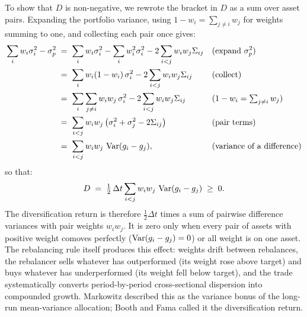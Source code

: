To show that $D$ is non-negative, we rewrote the bracket in $D$ as a
sum over asset pairs. Expanding the portfolio variance, using
$1 - w_i = \sum_{j \ne i} w_j$ for weights summing to one, and
collecting each pair once gives:
\begin{align}
  \sum_i w_i \sigma_i^2 - \sigma_p^2
   &\;=\; \sum_i w_i \sigma_i^2 - \sum_i w_i^2 \sigma_i^2
     - 2 \sum_{i<j} w_i w_j \Sigma_{ij}
     && \text{(expand $\sigma_p^2$)} \notag \\
   &\;=\; \sum_i w_i (1 - w_i)\, \sigma_i^2
     - 2 \sum_{i<j} w_i w_j \Sigma_{ij}
     && \text{(collect)} \notag \\
   &\;=\; \sum_i \sum_{j \ne i} w_i w_j\, \sigma_i^2
     - 2 \sum_{i<j} w_i w_j \Sigma_{ij}
     && \text{($1 - w_i = \textstyle\sum_{j \ne i} w_j$)} \notag \\
   &\;=\; \sum_{i<j} w_i w_j
     \left(\sigma_i^2 + \sigma_j^2 - 2\Sigma_{ij}\right)
     && \text{(pair terms)} \notag \\
   &\;=\; \sum_{i<j} w_i w_j \,\operatorname{Var}(g_i - g_j),
     && \text{(variance of a difference)}
  \label{eq:pair-identity}
\end{align}
so that:
\begin{equation}
  D \;=\; \tfrac{1}{2}\,\Delta t \sum_{i<j} w_i w_j \,\operatorname{Var}(g_i - g_j)
  \;\ge\; 0.
  \label{eq:dr-pairwise}
\end{equation}
The diversification return is therefore $\tfrac{1}{2}\Delta t$ times
a sum of pairwise difference variances with pair weights $w_i w_j$.
It is zero only when every pair of assets with positive weight
comoves perfectly ($\operatorname{Var}(g_i - g_j) = 0$) or all weight is on one
asset. The rebalancing rule itself produces
this effect: weights drift between rebalances, the rebalancer sells
whatever has outperformed (its weight rose above target) and buys
whatever has underperformed (its weight fell below target), and the
trade systematically converts period-by-period cross-sectional
dispersion into compounded growth. Markowitz
\cite{markowitz1976longRun} described this as the variance bonus of
the long-run mean-variance allocation; Booth and Fama
\cite{boothFama1992} called it the diversification return.

